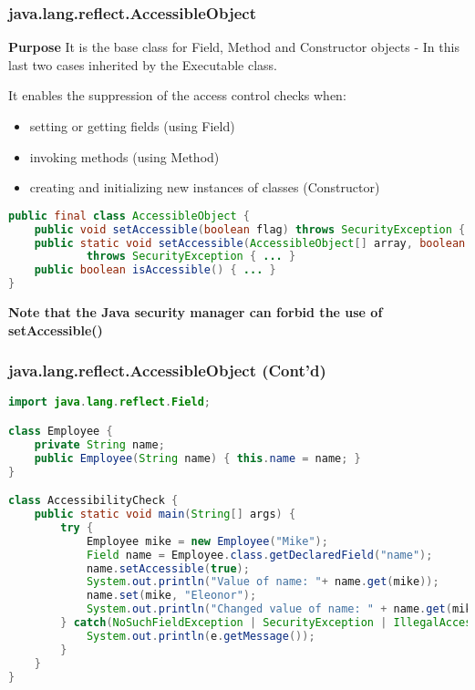 \subsubsection{java.lang.reflect.AccessibleObject}

\textbf{Purpose}
It is the base class for Field, Method and Constructor objects
	- In this last two cases inherited by the Executable class.

It enables the suppression of the access control checks when:
\begin{itemize}
	\item setting or getting fields (using Field)
	\item invoking methods (using Method)
	\item  creating and initializing new instances of classes (Constructor)
\end{itemize}

\begin{lstlisting}[language=Java]
public final class AccessibleObject {
	public void setAccessible(boolean flag) throws SecurityException { ... }
	public static void setAccessible(AccessibleObject[] array, boolean flag)
			throws SecurityException { ... }
	public boolean isAccessible() { ... }
}
\end{lstlisting}

\textbf{Note that the Java security manager can forbid the use of setAccessible()}

\subsubsection{java.lang.reflect.AccessibleObject (Cont'd)}

\begin{lstlisting}[language=Java]
import java.lang.reflect.Field;

class Employee {
	private String name;
	public Employee(String name) { this.name = name; }
}

class AccessibilityCheck {
	public static void main(String[] args) {
		try {
			Employee mike = new Employee("Mike");
			Field name = Employee.class.getDeclaredField("name");
			name.setAccessible(true);
			System.out.println("Value of name: "+ name.get(mike));
			name.set(mike, "Eleonor");
			System.out.println("Changed value of name: " + name.get(mike));
		} catch(NoSuchFieldException | SecurityException | IllegalAccessException e) {
			System.out.println(e.getMessage());
		}
	}
}
\end{lstlisting}

